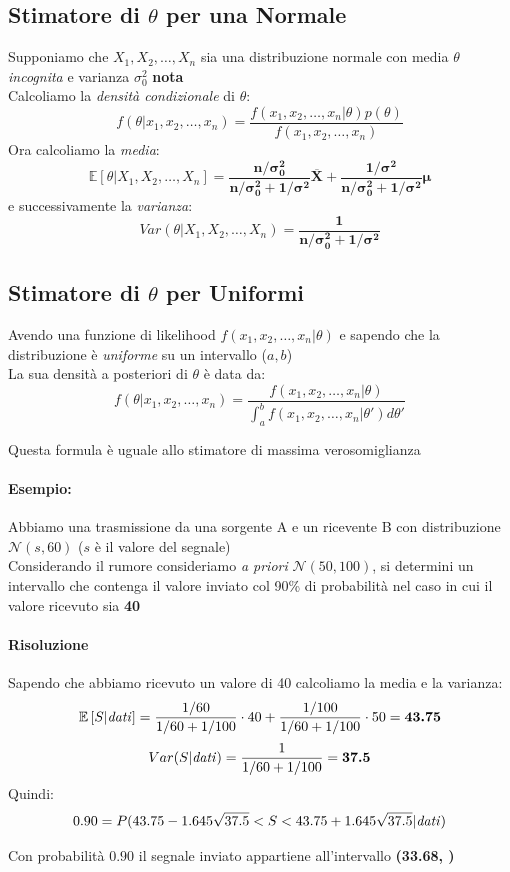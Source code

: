 \documentclass[]{article}
\newcommand{\ev}{\mathbb{E}[X]}
\renewcommand{\ev}[1]{\mathbb{E}\left[#1\right]}
\begin{document}
    \subsection{Stimatore di $\theta$ per una Normale}
    Supponiamo che $X_1, X_2, \ldots, X_n$ sia una distribuzione normale con media $\theta$ \textit{incognita} e varianza $\sigma^2_0$ \textbf{nota} \\[2ex]
    Calcoliamo la \textit{densità condizionale} di $\theta$:
    \[ f(\theta \rvert x_1, x_2, \ldots, x_n) = \frac{f(x_1, x_2, \ldots, x_n \rvert \theta) p(\theta)}{f(x_1, x_2, \ldots, x_n)} \]
    Ora calcoliamo la \textit{media}:
    \[ \ev{\theta \rvert X_1, X_2, \ldots, X_n } = \boldsymbol{\frac{n / \sigma^2_0}{n / \sigma^2_0 + 1 / \sigma^2} \overline{X} + \frac{1 / \sigma^2}{n / \sigma^2_0 + 1 / \sigma^2} \mu} \]
    e successivamente la \textit{varianza}:
    \[ Var(\theta \rvert X_1, X_2, \ldots, X_n) = \boldsymbol{\frac{1}{n / \sigma^2_0 + 1 / \sigma^2}} \]
    \subsection{Stimatore di $\theta$ per Uniformi}
    Avendo una funzione di likelihood $f(x_1, x_2, \ldots, x_n \rvert \theta)$ e sapendo che la distribuzione è \textit{uniforme} su un intervallo ($a,b$) \\ 
    La sua densità a posteriori di $\theta$ è data da:
    \[ f(\theta \rvert x_1, x_2, \ldots, x_n) = \frac{f(x_1,x_2, \ldots, x_n \rvert \theta)}{\int_{a}^{b} f(x_1, x_2, \ldots, x_n \rvert \theta') d \theta'} \]
    \centerline{Questa formula è uguale allo stimatore di massima verosomiglianza}
    \paragraph{Esempio:} Abbiamo una trasmissione da una sorgente A e un ricevente B con distribuzione $\mathcal{N}(s, 60)$ ($s$ è il valore del segnale) \\
    Considerando il rumore consideriamo \textit{a priori} $\mathcal{N}(50, 100)$, si determini un intervallo che contenga il valore inviato col 90\% di probabilità nel caso in cui il valore ricevuto sia \textbf{40}
    \paragraph{Risoluzione} Sapendo che abbiamo ricevuto un valore di 40 calcoliamo la media e la varianza:
    \[ \ev{S | \text{\textit{dati}}} = \frac{1 / 60}{1 / 60 + 1/100} \cdot 40 + \frac{1 / 100}{1 / 60 + 1/100} \cdot 50 = \boldsymbol{43.75} \]
    \[ Var(S | \text{\textit{dati}}) = \frac{1}{1/60 + 1/100} = \boldsymbol{37.5} \]
    Quindi:
    \[ 0.90 = P(43.75 - 1.645 \sqrt{37.5} < S < 43.75 + 1.645 \sqrt{37.5} | \text{\textit{dati}}) \]
    \centerline{Con probabilità $0.90$ il segnale inviato appartiene all'intervallo \textbf{(33.68, )}}
    \newpage
\end{document}
